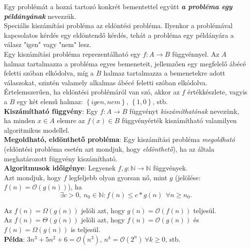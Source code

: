 \documentclass[tikz,12pt,margin=0px]{article}
\begin{document}
	\noindent Egy problémát a hozzá tartozó konkrét bementettel együtt \emph{\textbf{a probléma egy példányának}} nevezzük.\\
	
    \noindent Speciális kiszámítási probléma az eldöntési probléma. Ilyenkor a problémával kapcsolatos kérdés egy eldöntendő kérdés, tehát a probléma egy példányára a válasz "igen" vagy "nem" lesz.\\

    \noindent Egy kiszámítási probléma reprezentálható egy $f : A \to B$ függvénnyel. Az $A$ halmaz tartalmazza a probléma egyes bemeneteit, jellemzően egy megfelelő ábécé feletti szóban elkódolva, míg a $B$ halmaz tartalmazza a bemenetekre adott válaszokat, szintén valamely alkalmas ábécé feletti szóban elkódolva. Értelemszerűen, ha eldöntési problémáról van szó, akkor az $f$ értékkészlete, vagyis a $B$ 	egy két elemű halmaz: $\left\{igen, nem\right\}$, $\left\{1, 0\right\}$, stb.\\
	
    \noindent \textbf{Kiszámítható függvény}: Egy $f : A \to B$ függvényt \textit{kiszámíthatónak} nevezünk, ha minden $x \in A$ elemre az $f(x) \in B$ függvényérték kiszámítható valamilyen 	algoritmikus modellel.\\
	
    \noindent \textbf{Megoldható, eldönthető probléma}: Egy kiszámítási probléma \textit{megoldható} (eldöntési probléma esetén azt mondjuk, hogy \textit{eldönthető}), ha az általa meghatározott függvény kiszámítható.\\

    \noindent \textbf{Algoritmusok időigénye}: Legyenek $f,g: \mathbb{N} \to \mathbb{N}$ függvények.\\

    \noindent Azt mondjuk, hogy $f$ legfeljebb olyan gyorsan nő, mint $g$ (jelölése: $f(n) = \mathcal{O}(g(n))$), ha
    \[
        \exists c>0,\ n_{0} \in \mathbb{N} : f(n) \leq c * g(n)\ \ \forall n \geq n_{0}.
    \]

    \noindent Az $f(n) = \Omega(g(n))$ jelöli azt, hogy $g(n) = \mathcal{O}(f(n))$ teljesül. \\
    \noindent Az $f(n) = \Theta(g(n))$ jelöli azt, hogy  $f(n) = \mathcal{O}(g(n))$ és $f(n) = \Omega(g(n))$ is teljesül.\\
	
	\noindent \textbf{Példa}: $3n^{3} + 5n^{2} + 6 = \mathcal{O}(n^{3})$, $n^{k} = \mathcal{O}(2^{n}) \ \forall k \geq 0$, stb.\\
	
\end{document}
